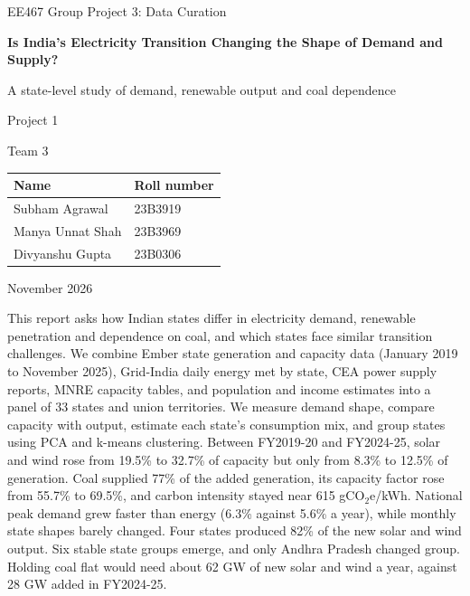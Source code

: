 \documentclass[10pt,a4paper]{article}
\makeatletter
\renewcommand{\section}{\@startsection{section}{1}{0pt}{12pt plus 2pt}{5pt}{\large\bfseries}}
\makeatother
\begin{document}
\begin{titlepage}
\centering
\vspace*{3cm}
{\Large EE467 Group Project 3: Data Curation\par}
\vspace{1.2cm}
{\LARGE\bfseries Is India's Electricity Transition Changing the Shape of Demand and Supply?\par}
\vspace{0.5cm}
{\large A state-level study of demand, renewable output and coal dependence\par}
\vspace{1.8cm}
{\large Project 1\par}\vspace{2pt}
{\large Team 3\par}
\vspace{1.5cm}
\begin{tabular}{ll}
\toprule
Name & Roll number\\
\midrule
Subham Agrawal & 23B3919\\
Manya Unnat Shah & 23B3969\\
Divyanshu Gupta & 23B0306\\
\bottomrule
\end{tabular}
\vfill
{\large November 2026\par}
\end{titlepage}
\setcounter{page}{1}

\section{Abstract}
This report asks how Indian states differ in electricity demand, renewable penetration and dependence on coal, and which states face similar transition challenges. We combine Ember state generation and capacity data (January 2019 to November 2025), Grid-India daily energy met by state, CEA power supply reports, MNRE capacity tables, and population and income estimates into a panel of 33 states and union territories. We measure demand shape, compare capacity with output, estimate each state's consumption mix, and group states using PCA and k-means clustering. Between FY2019-20 and FY2024-25, solar and wind rose from 19.5\% to 32.7\% of capacity but only from 8.3\% to 12.5\% of generation. Coal supplied 77\% of the added generation, its capacity factor rose from 55.7\% to 69.5\%, and carbon intensity stayed near 615 gCO$_2$e/kWh. National peak demand grew faster than energy (6.3\% against 5.6\% a year), while monthly state shapes barely changed. Four states produced 82\% of the new solar and wind output. Six stable state groups emerge, and only Andhra Pradesh changed group. Holding coal flat would need about 62 GW of new solar and wind a year, against 28 GW added in FY2024-25.
\end{document}
